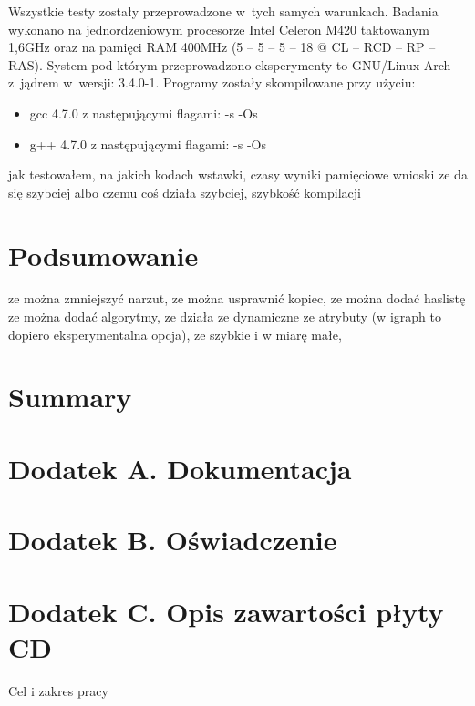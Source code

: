 \documentclass[a4paper,12pt,polish,oneside]{thesis}
\begin{document}
Wszystkie testy zostały przeprowadzone w~tych samych warunkach.
Badania wykonano na jednordzeniowym procesorze Intel Celeron M420 taktowanym 1,6GHz oraz na pamięci RAM 400MHz (5 -- 5 -- 5 -- 18 @ CL -- RCD -- RP -- RAS).
System pod którym przeprowadzono eksperymenty to GNU/Linux Arch z~jądrem w~wersji: 3.4.0-1.
Programy zostały skompilowane przy użyciu:
\begin{itemize}
	\item gcc 4.7.0 z następującymi flagami: -s -Os
	\item g++ 4.7.0 z następującymi flagami: -s -Os
\end{itemize}

jak testowałem, na jakich kodach wstawki, czasy wyniki pamięciowe wnioski ze da się szybciej albo czemu coś działa szybciej, szybkość kompilacji
\chapter*{Podsumowanie}
ze można zmniejszyć narzut, ze można usprawnić kopiec, ze można dodać haslistę  ze można dodać algorytmy, 
   ze działa ze dynamiczne ze atrybuty (w igraph to dopiero eksperymentalna opcja), ze szybkie i w miarę małe, 
\chapter*{Summary}

\chapter*{Dodatek A. Dokumentacja}
\chapter*{Dodatek B. Oświadczenie}
\chapter*{Dodatek C. Opis zawartości płyty CD}
\label{chap:cd}

Cel i zakres pracy\cite{bib:test}

\listoffigures
\listoftables
\lstlistoflistings
\end{document}
